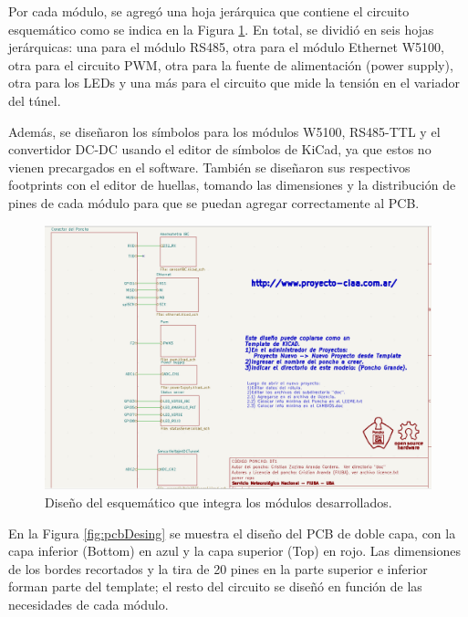 Por cada módulo, se agregó una hoja jerárquica que contiene el circuito esquemático como se indica en la Figura \ref{fig:esquematicoPonchoDatalogger}. En total, se dividió en seis hojas jerárquicas: una para el módulo RS485, otra para el módulo Ethernet W5100, otra para el circuito PWM, otra para la fuente de alimentación (power supply), otra para los LEDs y una más para el circuito que mide la tensión en el variador del túnel.

Además, se diseñaron los símbolos para los módulos W5100, RS485-TTL y el convertidor DC-DC usando el editor de símbolos de KiCad, ya que estos no vienen precargados en el software. También se diseñaron sus respectivos footprints con el editor de huellas, tomando las dimensiones y la distribución de pines de cada módulo para que se puedan agregar correctamente al PCB.

\begin{figure}[H]
    \centering
    \includegraphics[width=0.95\linewidth]{Figuras/datalogger/Hardware/esquematicoPonchoDatalogger.png}
    \caption{Diseño del esquemático que integra los módulos desarrollados.}
    \label{fig:esquematicoPonchoDatalogger}
\end{figure}




En la Figura \ref{fig:pcbDesing} se muestra el diseño del PCB de doble capa, con la capa inferior (Bottom) en azul y la capa superior (Top) en rojo. Las dimensiones de los bordes recortados y la tira de 20 pines en la parte superior e inferior forman parte del template; el resto del circuito se diseñó en función de las necesidades de cada módulo.

